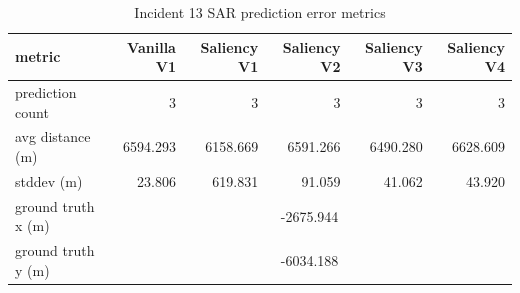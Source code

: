 \begin{table}[ht]
\centering
\caption{Incident 13 SAR prediction error metrics}
\label{tab:sar-incident-13}
\begin{tabular}{lrrrrr}
\hline
metric & Vanilla V1 & Saliency V1 & Saliency V2 & Saliency V3 & Saliency V4 \\
\hline
prediction count & 3 & 3 & 3 & 3 & 3 \\
avg distance (m) & 6594.293 & 6158.669 & 6591.266 & 6490.280 & 6628.609 \\
stddev (m) & 23.806 & 619.831 & 91.059 & 41.062 & 43.920 \\
ground truth x (m) & \multicolumn{5}{c}{-2675.944} \\
ground truth y (m) & \multicolumn{5}{c}{-6034.188} \\
\hline
\end{tabular}
\end{table}

